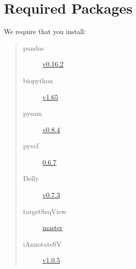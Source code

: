 \documentclass[letterpaper,10pt,english]{sphinxmanual}
\begin{document}
\section{Required Packages}
\label{iCallSV:required-packages}
We require that you install:
\begin{quote}\begin{description}
\item[{pandas}] \leavevmode
\href{http://pandas.pydata.org/}{v0.16.2}

\item[{biopython}] \leavevmode
\href{http://biopython.org/wiki/Main\_Page}{v1.65}

\item[{pysam}] \leavevmode
\href{https://pypi.python.org/pypi/pysam}{v0.8.4}

\item[{pyvcf}] \leavevmode
\href{https://pypi.python.org/pypi/PyVCF}{0.6.7}

\item[{Delly}] \leavevmode
\href{https://github.com/tobiasrausch/delly}{v0.7.3}

\item[{targetSeqView}] \leavevmode
\href{https://github.com/Eitan177/targetSeqView}{master}

\item[{iAnnotateSV}] \leavevmode
\href{https://github.com/rhshah/iAnnotateSV/tree/1.0.5}{v1.0.5}

\end{description}\end{quote}
\end{document}
